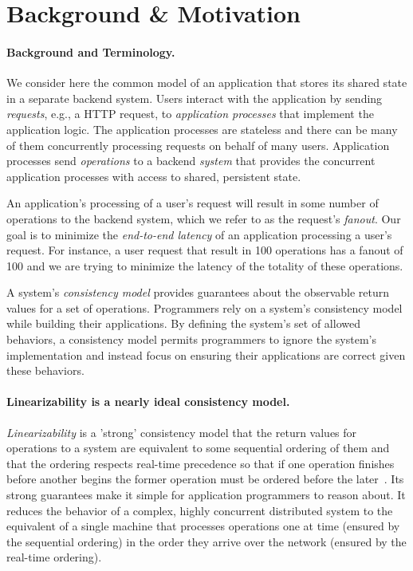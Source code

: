 \section{Background \& Motivation}


\paragraph{Background and Terminology.}
We consider here the common model of an application that stores its shared state in a separate backend system.
Users interact with the application by sending \textit{requests}, e.g., a HTTP request, to \textit{application processes} that implement the application logic. The application processes are stateless and there can be many of them concurrently processing requests on behalf of many users. Application processes send \textit{operations} to a backend \textit{system} that provides the concurrent application processes with access to shared, persistent state.



An application's processing of a user's request will result in some number of operations to the backend system, which we refer to as the request's \textit{fanout}. Our goal is to minimize the \textit{end-to-end latency} of an application processing a user's request. For instance, a user request that result in 100 operations has a fanout of 100 and we are trying to minimize the latency of the totality of these operations.

A system's \textit{consistency model} provides guarantees about the observable return values for a set of operations.
Programmers rely on a system's consistency model while building their applications. By defining the system's set of allowed behaviors, a consistency model permits programmers to ignore the system's implementation and instead focus on ensuring their applications are correct given these behaviors.

\paragraph{Linearizability is a nearly ideal consistency model.}
\textit{Linearizability} is a 'strong' consistency model that the return values for operations to a system are equivalent to some sequential ordering of them and that the ordering respects real-time precedence so that if one operation finishes before another begins the former operation must be ordered before the later~\cite{herlihy1987linearizability, herlihy1990linearizability}.
Its strong guarantees make it simple for application programmers to reason about. It reduces the behavior of a complex, highly concurrent distributed system to the equivalent of a single machine that processes operations one at time (ensured by the sequential ordering) in the order they arrive over the network (ensured by the real-time ordering). 


